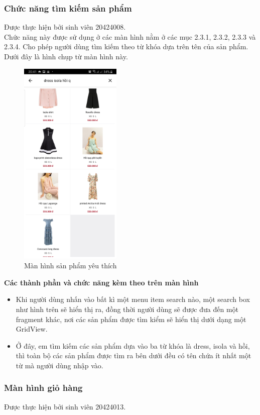 \documentclass[12pt]{article}
\begin{document}
\subsubsection{Chức năng tìm kiếm sản phẩm}
Được thực hiện bởi sinh viên 20424008.\\

\indent Chức năng này được sử dụng ở các màn hình nằm ở các mục 2.3.1, 2.3.2, 2.3.3 và 2.3.4. Cho phép người dùng tìm kiếm theo từ khóa dựa trên tên của sản phẩm. Dưới đây là hình chụp từ màn hình này.

\begin{figure}[H]
    \centering
    \includegraphics[height=10cm]{images/26.png}
    \caption{Màn hình sản phẩm yêu thích}
\end{figure}

\indent \textbf{Các thành phần và chức năng kèm theo trên màn hình}
\begin{itemize}
    \item Khi người dùng nhấn vào bất kì một menu item search nào, một search box như hình trên sẽ hiển thị ra, đồng thời người dùng sẽ được đưa đến một fragment khác, nơi các sản phẩm được tìm kiểm sẽ hiển thị dưới dạng một GridView.
    \item Ở đây, em tìm kiếm các sản phẩm dựa vào ba từ khóa là \textsf{dress}, \textsf{isola} và \textsf{hồi}, thì toàn bộ các sản phẩm được tìm ra bên dưới đều có tên chứa ít nhất một từ mà người dùng nhập vào.
\end{itemize}

\subsubsection{Màn hình giỏ hàng}
Được thực hiện bởi sinh viên 20424013.\\
\end{document}
